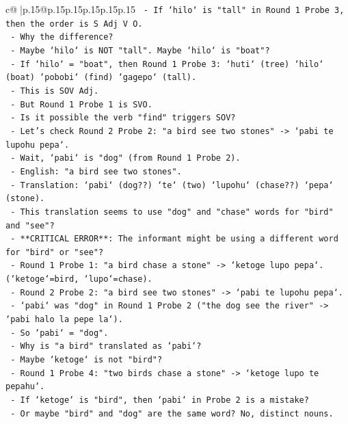 \documentclass{article}
\begin{document}
{\begin{supertabular}{c@{$\;$}|p{.15\linewidth}@{}p{.15\linewidth}p{.15\linewidth}p{.15\linewidth}p{.15\linewidth}p{.15\linewidth}}
{{{\texttt{      {-} If `hilo` is "tall" in Round 1 Probe 3, then the order is S Adj V O.} \\
\texttt{      {-} Why the difference?} \\
\texttt{      {-} Maybe `hilo` is NOT "tall". Maybe `hilo` is "boat"?} \\
\texttt{      {-} If `hilo` = "boat", then Round 1 Probe 3: `huti` (tree) `hilo` (boat) `pobobi` (find) `gagepo` (tall).} \\
\texttt{      {-} This is SOV Adj.} \\
\texttt{      {-} But Round 1 Probe 1 is SVO.} \\
\texttt{      {-} Is it possible the verb "find" triggers SOV?} \\
\texttt{      {-} Let's check Round 2 Probe 2: "a bird see two stones" {-}> `pabi te lupohu pepa`.} \\
\texttt{      {-} Wait, `pabi` is "dog" (from Round 1 Probe 2).} \\
\texttt{      {-} English: "a bird see two stones".} \\
\texttt{      {-} Translation: `pabi` (dog??) `te` (two) `lupohu` (chase??) `pepa` (stone).} \\
\texttt{      {-} This translation seems to use "dog" and "chase" words for "bird" and "see"?} \\
\texttt{      {-} **CRITICAL ERROR**: The informant might be using a different word for "bird" or "see"?} \\
\texttt{      {-} Round 1 Probe 1: "a bird chase a stone" {-}> `ketoge lupo pepa`. (`ketoge`=bird, `lupo`=chase).} \\
\texttt{      {-} Round 2 Probe 2: "a bird see two stones" {-}> `pabi te lupohu pepa`.} \\
\texttt{      {-} `pabi` was "dog" in Round 1 Probe 2 ("the dog see the river" {-}> `pabi halo la pepe la`).} \\
\texttt{      {-} So `pabi` = "dog".} \\
\texttt{      {-} Why is "a bird" translated as `pabi`?} \\
\texttt{      {-} Maybe `ketoge` is not "bird"?} \\
\texttt{      {-} Round 1 Probe 4: "two birds chase a stone" {-}> `ketoge lupo te pepahu`.} \\
\texttt{      {-} If `ketoge` is "bird", then `pabi` in Probe 2 is a mistake?} \\
\texttt{      {-} Or maybe "bird" and "dog" are the same word? No, distinct nouns.} \\
}}}
\end{supertabular}}
\end{document}
